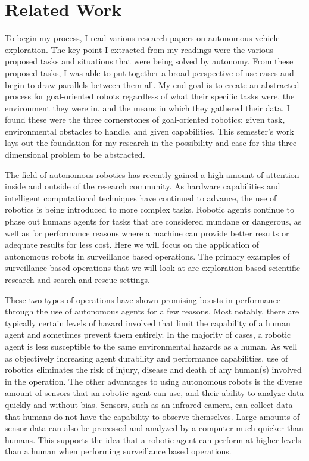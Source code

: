 

\chapter{Related Work}
To begin my process, I read various research papers on autonomous vehicle exploration.
The key point I extracted from my readings were the various proposed tasks and situations that were being solved by autonomy.
From these proposed tasks, I was able to put together a broad perspective of use cases and begin to draw parallels between them all.
My end goal is to create an abstracted process for goal-oriented robots regardless of what their specific tasks were, the environment they were in, and the means in which they gathered their data.
I found these were the three cornerstones of goal-oriented robotics: given task, environmental obstacles to handle, and given capabilities.
This semester’s work lays out the foundation for my research in the possibility and ease for this three dimensional problem to be abstracted.

The field of autonomous robotics has recently gained a high amount of attention inside and outside of the research community.
As hardware capabilities and intelligent computational techniques have continued to advance, the use of robotics is being introduced to more complex tasks.
Robotic agents continue to phase out humans agents for tasks that are considered mundane or dangerous, as well as for performance reasons where a machine can provide better results or adequate results for less cost.
Here we will focus on the application of autonomous robots in surveillance based operations.
The primary examples of surveillance based operations that we will look at are exploration based scientific research and search and rescue settings.

These two types of operations have shown promising boosts in performance through the use of autonomous agents for a few reasons.
Most notably, there are typically certain levels of hazard involved that limit the capability of a human agent and sometimes prevent them entirely.
In the majority of cases, a robotic agent is less susceptible to the same environmental hazards as a human.
As well as objectively increasing agent durability and performance capabilities, use of robotics eliminates the risk of injury, disease and death of any human(s) involved in the operation.
The other advantages to using autonomous robots is the diverse amount of sensors that an robotic agent can use, and their ability to analyze data quickly and without bias.
Sensors, such as an infrared camera, can collect data that humans do not have the capability to observe themselves.
Large amounts of sensor data can also be processed and analyzed by a computer much quicker than humans.
This supports the idea that a robotic agent can perform at higher levels than a human when performing surveillance based operations.

